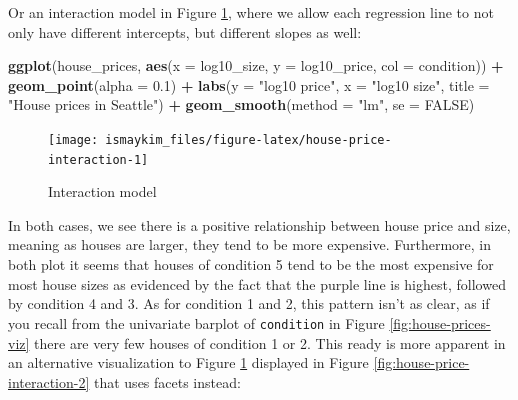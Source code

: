 \documentclass[12pt,]{krantz}
\makeatletter
\newenvironment{Shaded}{\begin{snugshade}}{\end{snugshade}}
\newcommand{\KeywordTok}[1]{\textcolor[rgb]{0.27,0.27,0.27}{\textbf{#1}}}
\newcommand{\DataTypeTok}[1]{\textcolor[rgb]{0.27,0.27,0.27}{#1}}
\newcommand{\FloatTok}[1]{\textcolor[rgb]{0.06,0.06,0.06}{#1}}
\newcommand{\StringTok}[1]{\textcolor[rgb]{0.5,0.5,0.5}{#1}}
\newcommand{\OtherTok}[1]{\textcolor[rgb]{0.37,0.37,0.37}{#1}}
\newcommand{\OperatorTok}[1]{\textcolor[rgb]{0.43,0.43,0.43}{\textbf{#1}}}
\newcommand{\NormalTok}[1]{#1}
\newenvironment{kframe}{%
\medskip{}
\setlength{\fboxsep}{.8em}
 \def\at@end@of@kframe{}%
 \ifinner\ifhmode%
  \def\at@end@of@kframe{\end{minipage}}%
  \begin{minipage}{\columnwidth}%
 \fi\fi%
 \def\FrameCommand##1{\hskip\@totalleftmargin \hskip-\fboxsep
 \colorbox{shadecolor}{##1}\hskip-\fboxsep
     \hskip-\linewidth \hskip-\@totalleftmargin \hskip\columnwidth}%
 \MakeFramed {\advance\hsize-\width
   \@totalleftmargin\z@ \linewidth\hsize
   \@setminipage}}%
 {\par\unskip\endMakeFramed%
 \at@end@of@kframe}
\renewenvironment{Shaded}{\begin{kframe}}{\end{kframe}}
\theoremstyle{definition}
\theoremstyle{definition}
\theoremstyle{definition}
\theoremstyle{remark}
\makeatother
\begin{document}
Or an interaction model in Figure \ref{fig:house-price-interaction},
where we allow each regression line to not only have different
intercepts, but different slopes as well:

\begin{Shaded}
\begin{Highlighting}[]
\KeywordTok{ggplot}\NormalTok{(house_prices, }\KeywordTok{aes}\NormalTok{(}\DataTypeTok{x =}\NormalTok{ log10_size, }\DataTypeTok{y =}\NormalTok{ log10_price, }\DataTypeTok{col =}\NormalTok{ condition)) }\OperatorTok{+}
\StringTok{  }\KeywordTok{geom_point}\NormalTok{(}\DataTypeTok{alpha =} \FloatTok{0.1}\NormalTok{) }\OperatorTok{+}
\StringTok{  }\KeywordTok{labs}\NormalTok{(}\DataTypeTok{y =} \StringTok{"log10 price"}\NormalTok{, }\DataTypeTok{x =} \StringTok{"log10 size"}\NormalTok{, }\DataTypeTok{title =} \StringTok{"House prices in Seattle"}\NormalTok{) }\OperatorTok{+}
\StringTok{  }\KeywordTok{geom_smooth}\NormalTok{(}\DataTypeTok{method =} \StringTok{"lm"}\NormalTok{, }\DataTypeTok{se =} \OtherTok{FALSE}\NormalTok{)}
\end{Highlighting}
\end{Shaded}

\begin{figure}

{\centering \texttt{[image: ismaykim\_files/figure-latex/house-price-interaction-1]} 

}

\caption{Interaction model}\label{fig:house-price-interaction}
\end{figure}

In both cases, we see there is a positive relationship between house
price and size, meaning as houses are larger, they tend to be more
expensive. Furthermore, in both plot it seems that houses of condition 5
tend to be the most expensive for most house sizes as evidenced by the
fact that the purple line is highest, followed by condition 4 and 3. As
for condition 1 and 2, this pattern isn't as clear, as if you recall
from the univariate barplot of \texttt{condition} in Figure
\ref{fig:house-prices-viz} there are very few houses of condition 1 or
2. This ready is more apparent in an alternative visualization to Figure
\ref{fig:house-price-interaction} displayed in Figure
\ref{fig:house-price-interaction-2} that uses facets instead:
\end{document}
